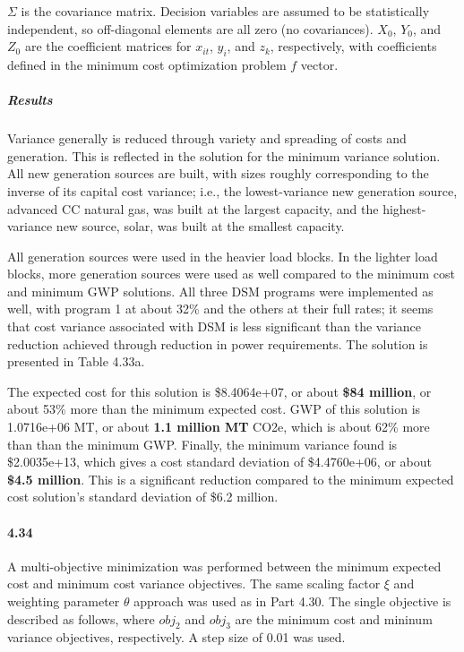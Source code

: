 \documentclass{article}
\begin{document}
	$\Sigma$ is the covariance matrix. Decision variables are assumed to be statistically independent, so off-diagonal elements are all zero (no covariances). $X_0$, $Y_0$, and $Z_0$ are the coefficient matrices for $x_{it}$, $y_i$, and $z_k$, respectively, with coefficients defined in the minimum cost optimization problem $f$ vector.
	
	\subparagraph{Results}
	Variance generally is reduced through variety and spreading of costs and generation. This is reflected in the solution for the minimum variance solution. All new generation sources are built, with sizes roughly corresponding to the inverse of its capital cost variance; i.e., the lowest-variance new generation source, advanced CC natural gas, was built at the largest capacity, and the highest-variance new source, solar, was built at the smallest capacity. 
	
	All generation sources were used in the heavier load blocks. In the lighter load blocks, more generation sources were used as well compared to the minimum cost and minimum GWP solutions. All three DSM programs were implemented as well, with program 1 at about 32\% and the others at their full rates; it seems that cost variance associated with DSM is less significant than the variance reduction achieved through reduction in power requirements. The solution is presented in Table 4.33a.
	
	The expected cost for this solution is \$8.4064e+07, or about \textbf{\$84 million}, or about 53\% more than the minimum expected cost. GWP of this solution is 1.0716e+06 MT, or about \textbf{1.1 million MT} CO2e, which is about 62\% more than than the minimum GWP. Finally, the minimum variance found is \$2.0035e+13, which gives a cost standard deviation of \$4.4760e+06, or about \textbf{\$4.5 million}. This is a significant reduction compared to the minimum expected cost solution's standard deviation of \$6.2 million. 
	
	

\paragraph{4.34}

	A multi-objective minimization was performed between the minimum expected cost and minimum cost variance objectives. The same scaling factor $\xi$ and weighting parameter $\theta$ approach was used as in Part 4.30. The single objective is described as follows, where $obj_2$ and $obj_3$ are the minimum cost and mininum variance objectives, respectively. A step size of 0.01 was used.
\end{document}
